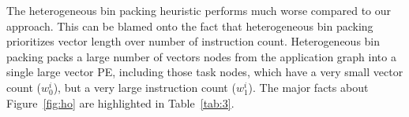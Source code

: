 The heterogeneous bin packing heuristic performs much worse compared to
our approach. This can be blamed onto the fact that heterogeneous bin
packing prioritizes vector length over number of instruction
count. Heterogeneous bin packing packs a large number of vectors nodes
from the application graph into a single large vector PE, including
those task nodes, which have a very small vector count ($w^i_0$), but a
very large instruction count ($w^i_1$). The major facts about
Figure~\ref{fig:ho} are highlighted in Table~\ref{tab:3}.

\begin{figure}[t!]
  \centering
\end{figure}
